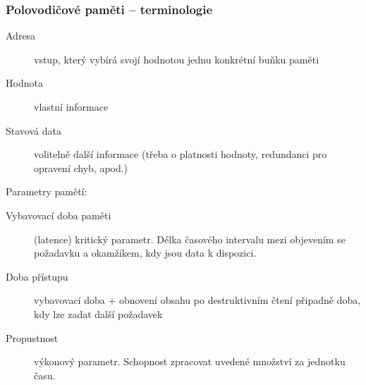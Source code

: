\begin{frame}
\frametitle{Polovodičové paměti -- terminologie}

\begin{description}
 \item[Adresa] vstup, který vybírá svojí hodnotou jednu konkrétní buňku paměti
 \item[Hodnota] vlastní informace
 \item[Stavová data] volitelně další informace (třeba o platnosti hodnoty, redundanci pro opravení chyb, apod.)
\end{description}

Parametry pamětí:

\begin{description}
  \item[Vybavovací doba paměti] (latence) kritický parametr. Délka časového intervalu mezi objevením se požadavku a okamžikem, kdy jsou data k dispozici.
  \item[Doba přístupu] vybavovací doba + obnovení obsahu po destruktivním čtení připadně doba, kdy lze zadat další požadavek
  \item[Propustnost] výkonový parametr. Schopnost zpracovat uvedené množství za jednotku času.
\end{description}

\end{frame}
